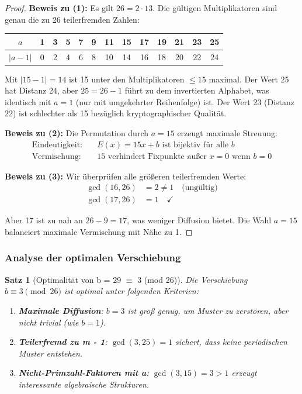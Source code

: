 ﻿\documentclass[12pt,a4paper]{article}
\newtheorem{theorem}{Satz}
\begin{document}
	\begin{proof}
		\textbf{Beweis zu (1):} 
		Es gilt $26 = 2 \cdot 13$. Die gültigen Multiplikatoren sind genau die zu 26 teilerfremden Zahlen:
		
		\begin{center}
			\begin{tabular}{|c|c|c|c|c|c|c|c|c|c|c|c|c|}
				\hline
				$a$ & 1 & 3 & 5 & 7 & 9 & 11 & 15 & 17 & 19 & 21 & 23 & 25 \\
				\hline
				$|a - 1|$ & 0 & 2 & 4 & 6 & 8 & 10 & 14 & 16 & 18 & 20 & 22 & 24 \\
				\hline
			\end{tabular}
		\end{center}
		
		Mit $|15 - 1| = 14$ ist 15 unter den Multiplikatoren $\leq 15$ maximal. Der Wert 25 hat 
		Distanz 24, aber $25 = 26 - 1$ führt zu dem invertierten Alphabet, was identisch mit $a = 1$ 
		(nur mit umgekehrter Reihenfolge) ist. Der Wert 23 (Distanz 22) ist schlechter als 15 
		bezüglich kryptographischer Qualität.
		
		\textbf{Beweis zu (2):}
		Die Permutation durch $a = 15$ erzeugt maximale Streuung:
		\begin{align}
			\text{Eindeutigkeit:} \quad & E(x) = 15x + b \text{ ist bijektiv für alle } b \\
			\text{Vermischung:} \quad & 15 \text{ verhindert Fixpunkte außer } x = 0 \text{ wenn } b = 0
		\end{align}
		
		\textbf{Beweis zu (3):}
		Wir überprüfen alle größeren teilerfremden Werte:
		\begin{align}
			\gcd(16, 26) &= 2 \neq 1 \quad \text{(ungültig)} \\
			\gcd(17, 26) &= 1 \quad \checkmark
		\end{align}
		
		Aber 17 ist zu nah an $26 - 9 = 17$, was weniger Diffusion bietet. Die Wahl $a = 15$ balanciert maximale Vermischung mit Nähe zu 1.
	\end{proof}
	
	\subsubsection{Analyse der optimalen Verschiebung}
	
	\begin{theorem}[Optimalität von b = 29 $\equiv$ 3 (mod 26)]
		Die Verschiebung $b \equiv 3 \pmod{26}$ ist optimal unter folgenden Kriterien:
		\begin{enumerate}
			\item \textbf{Maximale Diffusion}: $b = 3$ ist groß genug, um Muster zu zerstören, aber nicht trivial (wie $b = 1$).
			\item \textbf{Teilerfremd zu m - 1}: $\gcd(3, 25) = 1$ sichert, dass keine periodischen Muster entstehen.
			\item \textbf{Nicht-Primzahl-Faktoren mit a}: $\gcd(3, 15) = 3 > 1$ erzeugt interessante algebraische Strukturen.
		\end{enumerate}
	\end{theorem}
	
\end{document}
